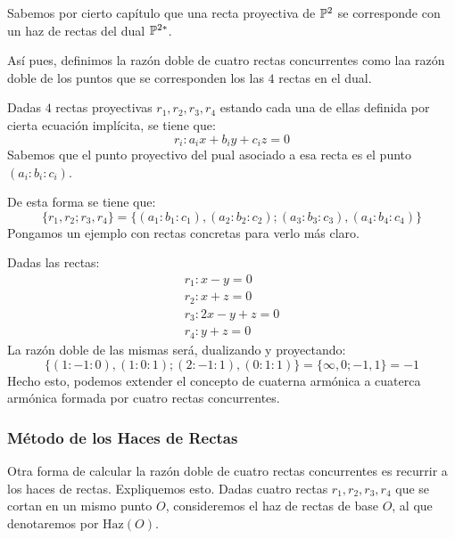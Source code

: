Sabemos por cierto capítulo que una recta proyectiva de $\mathbb{P}^2$ se corresponde con un haz de rectas del dual $\mathbb{P}^{2*}$.

Así pues, definimos la razón doble de cuatro rectas concurrentes como laa razón doble de los puntos que se corresponden los las $4$ rectas en el dual.

Dadas $4$ rectas proyectivas $r_1,r_2,r_3,r_4$ estando cada una de ellas definida por cierta ecuación implícita, se tiene que:
\[r_i:a_ix+b_iy+c_iz=0\]
Sabemos que el punto proyectivo del pual asociado a esa recta es el punto $(a_i:b_i:c_i)$.

De esta forma se tiene que:
\[\{r_1,r_2;r_3,r_4\}=\{(a_1:b_1:c_1),(a_2:b_2:c_2);(a_3:b_3:c_3),(a_4:b_4:c_4)\}\]
Pongamos un ejemplo con rectas concretas para verlo más claro.
\begin{exa}
	Dadas las rectas:
	\[\begin{array}{c}
	r_1:x-y=0\\
	r_2:x+z=0\\
	r_3:2x-y+z=0\\
	r_4:y+z=0
	\end{array}\]
	La razón doble de las mismas será, dualizando y proyectando:
	\[\{(1:-1:0),(1:0:1);(2:-1:1),(0:1:1)\}=\{\infty, 0; -1,1\}=-1\]
	Hecho esto, podemos extender el concepto de cuaterna armónica a cuaterca armónica formada por cuatro rectas concurrentes.
\end{exa}
\subsubsection{Método de los Haces de Rectas}
Otra forma de calcular la razón doble de cuatro rectas concurrentes es recurrir a los haces de rectas. Expliquemos esto. Dadas cuatro rectas $r_1,r_2,r_3,r_4$ que se cortan en un mismo punto $O$, consideremos el haz de rectas de base $O$, al que denotaremos por $\text{Haz}(O)$.